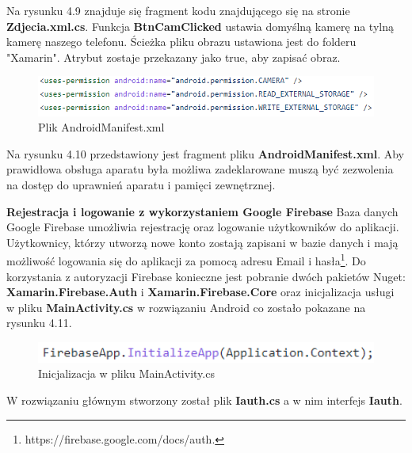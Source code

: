 Na rysunku 4.9 znajduje się fragment kodu znajdującego się na stronie \textbf{Zdjecia.xml.cs}. Funkcja \textbf{BtnCamClicked} ustawia domyślną kamerę na tylną kamerę naszego telefonu. Ścieżka pliku obrazu ustawiona jest do folderu "Xamarin". Atrybut zostaje przekazany jako true, aby zapisać obraz.
  
\begin{figure}[!htb]
	\begin{center}
		\includegraphics[width=12cm]{rys/Zdjecia_manifest.png}
		\caption{Plik AndroidManifest.xml}
		\label{rys:rysunek021}
	\end{center}
\end{figure}  

Na rysunku 4.10 przedstawiony jest fragment pliku \textbf{AndroidManifest.xml}. Aby prawidłowa obsługa aparatu była możliwa zadeklarowane muszą być zezwolenia na dostęp do uprawnień aparatu i pamięci zewnętrznej. \newline \newline

\textbf{Rejestracja i logowanie z wykorzystaniem Google Firebase} \newline
Baza danych Google Firebase umożliwia rejestrację oraz logowanie użytkowników do aplikacji. Użytkownicy, którzy utworzą nowe konto zostają zapisani w bazie danych i mają możliwość logowania się do aplikacji za pomocą adresu Email i hasła\footnote{https://firebase.google.com/docs/auth\cite{www3}.}. \newline
Do korzystania z autoryzacji Firebase konieczne jest pobranie dwóch pakietów Nuget: \textbf{Xamarin.Firebase.Auth} i \textbf{Xamarin.Firebase.Core} oraz inicjalizacja usługi w pliku \textbf{MainActivity.cs} w rozwiązaniu Android co zostało pokazane na rysunku 4.11.

\begin{figure}[!htb]
	\begin{center}
		\includegraphics[width=12cm]{rys/firebase_main_activity.png}
		\caption{Inicjalizacja w pliku MainActivity.cs}
		\label{rys:rysunek022}
	\end{center}
\end{figure}

W rozwiązaniu głównym  stworzony został plik \textbf{Iauth.cs} a w nim interfejs \textbf{Iauth}.
 
